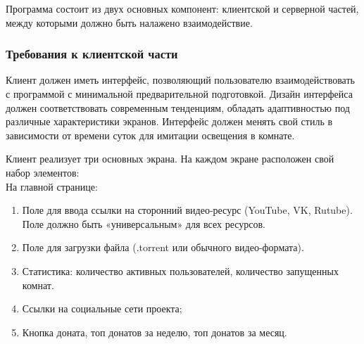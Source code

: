 Программа состоит из двух основных компонент: клиентской и серверной частей, между которыми должно быть налажено
взаимодействие.

\subsubsection{Требования к клиентской части}
Клиент должен иметь интерфейс, позволяющий пользователю взаимодействовать с программой с минимальной предварительной
подготовкой.
Дизайн интерфейса должен соответствовать современным тенденциям, обладать адаптивностью под различные характеристики
экранов.
Интерфейс должен менять свой стиль в зависимости от времени суток для имитации освещения в комнате.

Клиент реализует три основных экрана.
На каждом экране расположен свой набор элементов:\\

На главной странице:
\begin{enumerate}[noitemsep]
    \item Поле для ввода ссылки на сторонний видео-ресурс (YouTube, VK, Rutube).
    Поле должно быть «универсальным» для всех ресурсов.
    \item Поле для загрузки файла (.torrent или обычного видео-формата).
    \item Статистика: количество активных пользователей, количество запущенных комнат.
    \item Ссылки на социальные сети проекта;
    \item Кнопка доната, топ донатов за неделю, топ донатов за месяц.
\end{enumerate}

